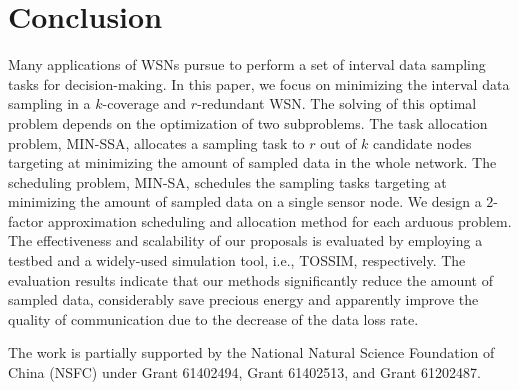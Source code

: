 \documentclass[prodmode,acmtosn]{acmsmall}
\begin{document}
\section{Conclusion}
\label{conclusion}
Many applications of WSNs  pursue to perform a set of interval data sampling tasks for decision-making.  In this paper, we focus on minimizing the interval data sampling in a $k$-coverage and $r$-redundant WSN. The solving of this optimal problem depends on the optimization of  two subproblems. The task allocation problem, MIN-SSA, allocates a sampling task to $r$ out of $k$ candidate nodes targeting at minimizing the amount of sampled data in the whole network. The scheduling problem, MIN-SA, schedules the sampling tasks targeting at minimizing the amount of sampled data on a single sensor node. We design a $2$-factor approximation scheduling and allocation method for each arduous problem. The effectiveness and scalability of our proposals is evaluated by employing a testbed and a widely-used simulation tool, i.e., TOSSIM, respectively. The evaluation results indicate that our methods significantly reduce the amount of sampled data, considerably save  precious energy and apparently improve the quality of communication due to the decrease of the data loss rate.

\begin{acks}
The work is partially supported by the National Natural Science Foundation of China (NSFC) under Grant 61402494, Grant 61402513, and Grant 61202487.
\end{acks}

%
%



\end{document}
